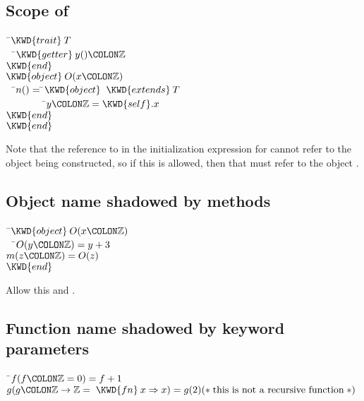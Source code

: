 \subsection{Scope of }
\begin{Fortress}
{\tt~}\pushtabs\=\+\( \KWD{trait}\:T\)\\
{\tt~~}\pushtabs\=\+\(   \KWD{getter}\:y()\COLON \mathbb{Z}\)\-\\\poptabs
\( \KWD{end}\)\\
\( \KWD{object}\:O(x\COLON \mathbb{Z})\)\\
{\tt~~}\pushtabs\=\+\(   n() =  \null\)\pushtabs\=\+\(\KWD{object}\;\;\KWD{extends}\:T\)\\
{\tt~~~~~~~~}\pushtabs\=\+\(           y\COLON \mathbb{Z} = \mathord{\KWD{self}}.x\)\-\\\poptabs
\(         \KWD{end}\)\-\-\\\poptabs\poptabs
\( \KWD{end}\)\-\\\poptabs
\end{Fortress}

Note that the reference to  in the initialization expression for
 cannot refer to the object being constructed, so if this is allowed, then that
 must refer to the object .

\subsection{Object name shadowed by methods}
\begin{Fortress}
{\tt~}\pushtabs\=\+\( \KWD{object}\:O(x\COLON \mathbb{Z})\)\\
{\tt~~}\pushtabs\=\+\(   O(y\COLON \mathbb{Z}) = y+3\)\\
\(   m(z\COLON \mathbb{Z}) = O(z)\)\-\\\poptabs
\( \KWD{end}\)\-\\\poptabs
\end{Fortress}

Allow this and .

\subsection{Function name shadowed by keyword parameters}
\begin{Fortress}
{\tt~}\pushtabs\=\+\( f(f\COLON \mathbb{Z} = 0) = f+1\)\\
\( g(g\COLON \mathbb{Z}\rightarrow\mathbb{Z} = \;\KWD{fn}\:x \Rightarrow x) = g(2)       \mathtt{(*}\;\hbox{\rm  this is not a recursive function \unskip}\;\mathtt{*)}\)\-\\\poptabs
\end{Fortress}

